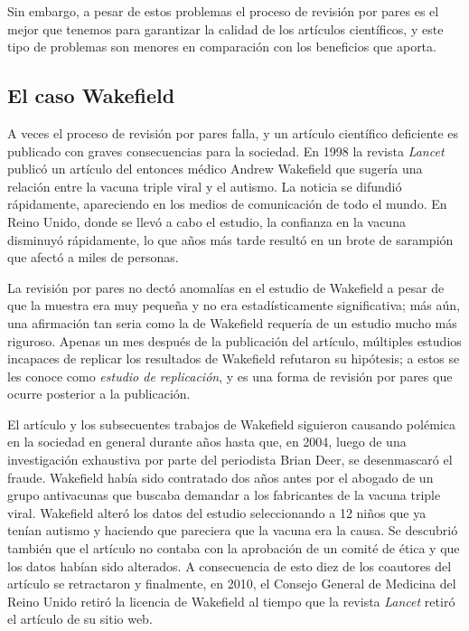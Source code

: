 Sin embargo, a pesar de estos problemas el proceso de revisión por pares es el
mejor que tenemos para garantizar la calidad de los artículos científicos, y
este tipo de problemas son menores en comparación con los beneficios que aporta.

\subsection*{El caso Wakefield}
A veces el proceso de revisión por pares falla, y un artículo científico
deficiente es publicado con graves consecuencias para la sociedad.
En 1998 la revista \emph{Lancet} publicó un artículo del entonces médico Andrew
Wakefield que sugería una relación entre la vacuna triple viral y el autismo.
La noticia se difundió rápidamente, apareciendo en los medios de comunicación
de todo el mundo.
En Reino Unido, donde se llevó a cabo el estudio, la confianza en la vacuna
disminuyó rápidamente, lo que años más tarde resultó en un brote de sarampión
que afectó a miles de personas.

La revisión por pares no dectó anomalías en el estudio de Wakefield a pesar de
que la muestra era muy pequeña y no era estadísticamente significativa; más aún,
una afirmación tan seria como la de Wakefield requería de un estudio mucho más
riguroso.
Apenas un mes después de la publicación del artículo, múltiples estudios
incapaces de replicar los resultados de Wakefield refutaron su hipótesis; a
estos se les conoce como \emph{estudio de replicación}, y es una forma de
revisión por pares que ocurre posterior a la publicación.

El artículo y los subsecuentes trabajos de Wakefield siguieron causando polémica
en la sociedad en general durante años hasta que, en 2004, luego de una
investigación exhaustiva por parte del periodista Brian Deer, se desenmascaró el
fraude\cite{Deerc1127}.
Wakefield había sido contratado dos años antes por el abogado de un grupo
antivacunas que buscaba demandar a los fabricantes de la vacuna triple viral.
Wakefield alteró los datos del estudio seleccionando a 12 niños que ya tenían
autismo y haciendo que pareciera que la vacuna era la causa.
Se descubrió también que el artículo no contaba con la aprobación de un comité
de ética y que los datos habían sido alterados.
A consecuencia de esto diez de los coautores del artículo se retractaron y
finalmente, en 2010, el Consejo General de Medicina del Reino Unido retiró la
licencia de Wakefield al tiempo que la revista \emph{Lancet} retiró el artículo
de su sitio web.

